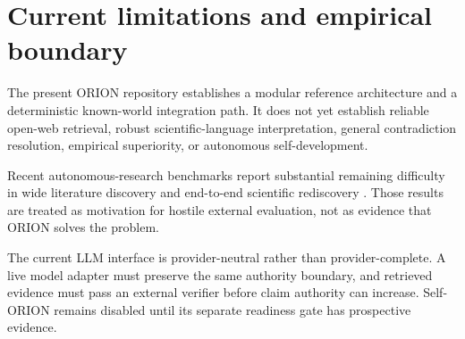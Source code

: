 \section{Current limitations and empirical boundary}

The present ORION repository establishes a modular reference architecture and a deterministic known-world integration path. It does not yet establish reliable open-web retrieval, robust scientific-language interpretation, general contradiction resolution, empirical superiority, or autonomous self-development.

Recent autonomous-research benchmarks report substantial remaining difficulty in wide literature discovery and end-to-end scientific rediscovery \cite{autoresearchbench2026,researchclawbench2026}. Those results are treated as motivation for hostile external evaluation, not as evidence that ORION solves the problem.

The current LLM interface is provider-neutral rather than provider-complete. A live model adapter must preserve the same authority boundary, and retrieved evidence must pass an external verifier before claim authority can increase. Self-ORION remains disabled until its separate readiness gate has prospective evidence.
